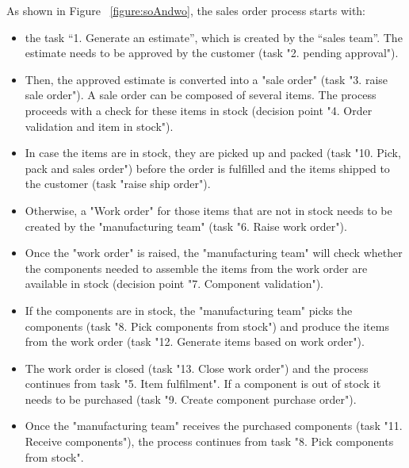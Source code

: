 As shown in Figure ~\ref{figure:soAndwo}, the sales order process starts with:

\begin{itemize}
    \item the task “1. Generate an estimate”, which is created by the “sales team”. The estimate needs to be approved by the customer (task "2. pending approval").
    \item Then, the approved estimate is converted into a  "sale order" (task "3. raise sale order"). A sale order can be  composed of several items. The process proceeds with a check for these items in stock (decision point "4. Order validation and item in stock").
    \item In case the items are in stock, they are picked up and packed (task "10. Pick, pack and sales order") before the order is fulfilled and the items shipped to the customer (task "raise ship order").
    \item Otherwise, a "Work order" for those items that are not in stock needs to be created by the "manufacturing team" (task "6. Raise work order").
    \item Once the "work order" is raised, the "manufacturing team" will check whether the components needed to assemble the items from the work order are available in stock (decision point "7. Component validation").
    \item If the components are in stock, the "manufacturing team" picks the components (task "8. Pick components from stock") and produce the items from the work order (task "12. Generate items based on work order").
    \item The work order is closed (task "13. Close work order") and the process continues from task "5. Item fulfilment". If a component is out of stock it needs to be purchased (task "9. Create component purchase order").
    \item Once the "manufacturing team" receives  the purchased components (task "11. Receive components"), the process continues from task "8. Pick components from stock".
\end{itemize}

